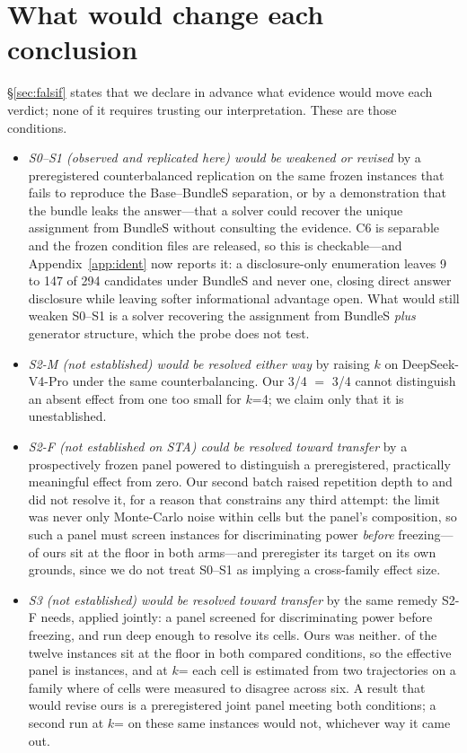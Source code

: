 \documentclass{article}
\begin{document}
\section{What would change each conclusion}
\label{app:falsif}
\S\ref{sec:falsif} states that we declare in advance what evidence would move each verdict; none of it requires trusting our interpretation. These are those conditions.

\begin{itemize}
\item \emph{S0--S1 (observed and replicated here) would be weakened or revised} by a preregistered counterbalanced replication on the same frozen instances that fails to reproduce the Base--BundleS separation, or by a demonstration that the bundle leaks the answer---that a solver could recover the unique assignment from BundleS without consulting the evidence. C6 is separable and the frozen condition files are released, so this is checkable---and Appendix~\ref{app:ident} now reports it: a disclosure-only enumeration leaves 9 to 147 of 294 candidates under BundleS and never one, closing direct answer disclosure while leaving softer informational advantage open. What would still weaken S0--S1 is a solver recovering the assignment from BundleS \emph{plus} generator structure, which the probe does not test.
\item \emph{S2-M (not established) would be resolved either way} by raising $k$ on DeepSeek-V4-Pro under the same counterbalancing. Our 3/4 $=$ 3/4 cannot distinguish an absent effect from one too small for $k$=4; we claim only that it is unestablished.
\item \emph{S2-F (not established on STA) could be resolved toward transfer} by a prospectively frozen panel powered to distinguish a preregistered, practically meaningful effect from zero. Our second batch raised repetition depth to \StatEightAK{} and did not resolve it, for a reason that constrains any third attempt: the limit was never only Monte-Carlo noise within cells but the panel's composition, so such a panel must screen instances for discriminating power \emph{before} freezing---\StatEightAFloorN{} of ours sit at the floor in both arms---and preregister its target on its own grounds, since we do not treat S0--S1 as implying a cross-family effect size.
\item \emph{S3 (not established) would be resolved toward transfer} by the same remedy S2-F needs, applied jointly: a panel screened for discriminating power before freezing, and run deep enough to resolve its cells. Ours was neither. \StatArmTwoFloorN{} of the twelve instances sit at the floor in both compared conditions, so the effective panel is \StatArmTwoInformativeN{} instances, and at $k$=\StatArmTwoK{} each cell is estimated from two trajectories on a family where \StatEightAUnstableCells{} of \StatEightACells{} cells were measured to disagree across six. A result that would revise ours is a preregistered joint panel meeting both conditions; a second run at $k$=\StatArmTwoK{} on these same instances would not, whichever way it came out.


\end{itemize}
\end{document}
